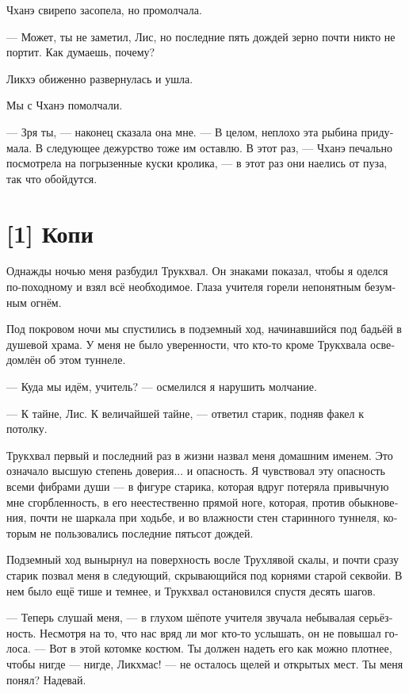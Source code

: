 \documentclass[a4paper,12pt,fleqn]{book}\usepackage{polyglossia}\setdefaultlanguage[babelshorthands=true]{russian}\setotherlanguage{english}\defaultfontfeatures{Ligatures=TeX,Mapping=tex-text}\usepackage{xcolor}\newcommand{\ml}[3]{#2}
\begin{document}
{Чханэ свирепо засопела, но промолчала.

--- Может, ты не заметил, Лис, но последние пять дождей зерно почти никто не портит.
Как думаешь, почему?

Ликхэ обиженно развернулась и ушла.

Мы с Чханэ помолчали.

--- Зря ты, --- наконец сказала она мне.
--- В целом, неплохо эта рыбина придумала.
В следующее дежурство тоже им оставлю.
В этот раз, --- Чханэ печально посмотрела на погрызенные куски кролика, --- в этот раз они наелись от пуза, так что обойдутся.

\section{[1] Копи}

Однажды ночью меня разбудил Трукхвал.
Он знаками показал, чтобы я оделся по-походному и взял всё необходимое.
Глаза учителя горели непонятным безумным огнём.

Под покровом ночи мы спустились в подземный ход, начинавшийся под бадьёй в душевой храма.
У меня не было уверенности, что кто-то кроме Трукхвала осведомлён об этом туннеле.

--- Куда мы идём, учитель? --- осмелился я нарушить молчание.

--- К тайне, Лис.
К величайшей тайне, --- ответил старик, подняв факел к потолку.

Трукхвал первый и последний раз в жизни назвал меня домашним именем.
Это означало высшую степень доверия... и опасность.
Я чувствовал эту опасность всеми фибрами души --- в фигуре старика, которая вдруг потеряла привычную мне сгорбленность, в его неестественно прямой ноге, которая, против обыкновения, почти не шаркала при ходьбе, и во влажности стен старинного туннеля, которым не пользовались последние пятьсот дождей.

Подземный ход вынырнул на поверхность восле Трухлявой скалы, и почти сразу старик позвал меня в следующий, скрывающийся под корнями старой секвойи.
В нем было ещё тише и темнее, и Трукхвал остановился спустя десять шагов.

--- Теперь слушай меня, --- в глухом шёпоте учителя звучала небывалая серьёзность.
Несмотря на то, что нас вряд ли мог кто-то услышать, он не повышал голоса.
--- Вот в этой котомке костюм.
Ты должен надеть его как можно плотнее, чтобы нигде --- нигде, Ликхмас! --- не осталось щелей и открытых мест.
Ты меня понял?
Надевай.

}
\end{document}
